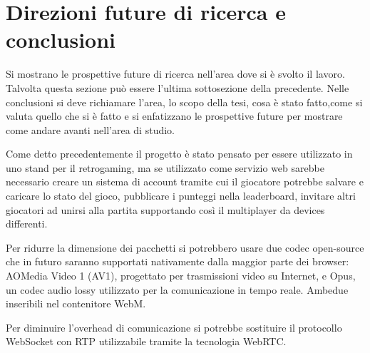 %
%

\chapter{Direzioni future di ricerca e conclusioni}
Si mostrano le prospettive future di ricerca nell’area dove si è svolto il lavoro. Talvolta questa sezione può essere l’ultima sottosezione della precedente. Nelle conclusioni si deve richiamare l’area, lo scopo della tesi, cosa è stato fatto,come si valuta quello che si è fatto e si enfatizzano le prospettive future per mostrare come andare avanti nell’area di studio.

Come detto precedentemente il progetto è stato pensato per essere utilizzato in uno stand per il retrogaming, ma se utilizzato come servizio web sarebbe necessario creare un sistema di account tramite cui il giocatore potrebbe salvare e caricare lo stato del gioco, pubblicare i punteggi nella leaderboard, invitare altri giocatori ad unirsi alla partita supportando così il multiplayer da devices differenti.

Per ridurre la dimensione dei pacchetti si potrebbero usare due codec open-source che in futuro saranno supportati nativamente dalla maggior parte dei browser: AOMedia Video 1 (AV1), progettato per trasmissioni video su Internet, e Opus, un codec audio lossy utilizzato per la comunicazione in tempo reale. Ambedue inseribili nel contenitore WebM.

Per diminuire l'overhead di comunicazione si potrebbe sostituire il protocollo WebSocket con RTP utilizzabile tramite la tecnologia WebRTC.